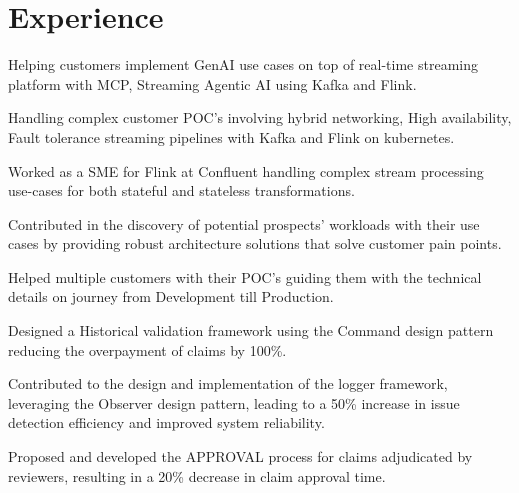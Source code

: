 \documentclass[]{deedy-resume-openfont}
\begin{document}
\begin{minipage}[t]{0.66\textwidth} 


\section{Experience}
\vspace{4mm}


\vspace{\topsep}
\begin{tightemize}
\item Helping customers implement GenAI use cases on top of real-time streaming platform with MCP, Streaming Agentic AI using Kafka and Flink.
\item Handling complex customer POC's involving hybrid networking, High availability, Fault tolerance streaming pipelines with Kafka and Flink on kubernetes.
\end{tightemize}
\sectionsep

\vspace{\topsep}
\begin{tightemize}
\item Worked as a SME for Flink at Confluent handling complex stream processing use-cases for both stateful and stateless transformations.
\item Contributed in the discovery of potential prospects' workloads with their use cases by providing robust architecture solutions that solve customer pain points.
\item Helped multiple customers with their POC's guiding them with the technical details on journey from Development till Production.
\end{tightemize}
\sectionsep

\vspace{\topsep}
\begin{tightemize}
\item Designed a Historical validation framework using the Command design pattern reducing the overpayment of claims by 100\%.
\item Contributed to the design and implementation of the logger framework, leveraging the Observer design pattern, leading to a 50\% increase in issue detection efficiency and improved system reliability.
\item Proposed and developed the APPROVAL process for claims adjudicated by reviewers, resulting in a 20\% decrease in claim approval time.
\end{tightemize}
\sectionsep


\end{minipage}
\end{document}

